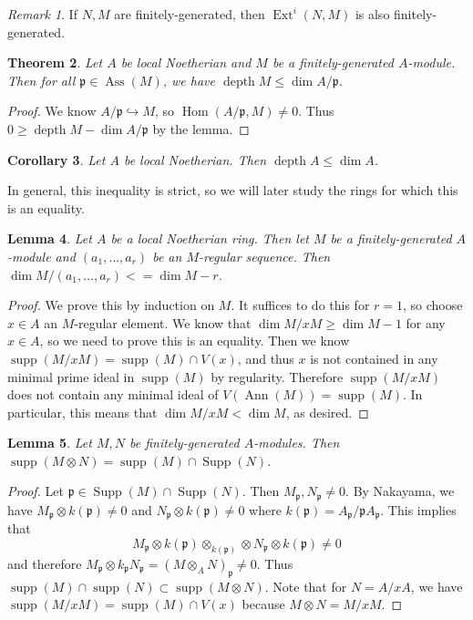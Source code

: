 \documentclass[leqno, openany]{memoir}
\newtheorem{thm}{Theorem}[section]
\newtheorem{cor}[thm]{Corollary}
\newtheorem{lem}[thm]{Lemma}
\theoremstyle{definition}
\theoremstyle{remark}
\newtheorem{rmk}[thm]{Remark}
\theoremstyle{plain}
\theoremstyle{definition}
\theoremstyle{remark}
\newcommand{\mf}[1]{\mathfrak{#1}}
\DeclareMathOperator{\Hom}{Hom}
\DeclareMathOperator{\supp}{supp}
\DeclareMathOperator{\Supp}{Supp}
\DeclareMathOperator{\Ext}{Ext}
\DeclareMathOperator{\Ann}{Ann}
\DeclareMathOperator{\Ass}{Ass}
\DeclareMathOperator{\dpth}{depth}
\begin{document}
\begin{rmk} If $N,M$ are finitely-generated, then $\Ext^i(N,M)$ is also
finitely-generated.  \end{rmk}

\begin{thm} Let $A$ be local Noetherian and $M$ be a finitely-generated
$A$-module. Then for all $\mf{p} \in \Ass(M)$, we have $\operatorname{depth} M
\leq \dim A/\mf{p}$.  \end{thm}

\begin{proof} We know $A/\mf{p} \hookrightarrow M$, so $\Hom(A/\mf{p}, M) \neq
0$. Thus $0 \geq \operatorname{depth} M - \dim A/\mf{p}$ by the lemma.
\end{proof}

\begin{cor} Let $A$ be local Noetherian. Then $\dpth A \leq \dim A$.  \end{cor}

In general, this inequality is strict, so we will later study the rings for
which this is an equality.

\begin{lem} Let $A$ be a local Noetherian ring. Then let $M$ be a
finitely-generated $A$-module and $(a_1, \ldots, a_r)$ be an $M$-regular
sequence. Then $\dim M/(a_1, \ldots, a_r)< = \dim M - r$.  \end{lem}

\begin{proof} We prove this by induction on $M$. It suffices to do this for $r
    = 1$, so choose $x \in A$ an $M$-regular element. We know that $\dim M/xM
    \geq \dim M - 1$ for any $x \in A$, so we need to prove this is an
    equality. Then we know $\supp(M/xM) = \supp(M) \cap V(x)$, and thus $x$ is
    not contained in any minimal prime ideal in $\supp(M)$ by regularity.
    Therefore $\supp(M/xM)$ does not contain any minimal ideal of $V(\Ann(M)) =
    \supp(M)$. In particular, this means that $\dim M/xM < \dim M$, as desired.
\end{proof}

\begin{lem} Let $M,N$ be finitely-generated $A$-modules. Then $\supp(M \otimes
N) = \supp(M) \cap \Supp(N)$.  \end{lem}

\begin{proof} Let $\mf{p} \in \Supp(M) \cap \Supp(N)$. Then $M_{\mf{p}},
    N_{\mf{p}} \neq 0$. By Nakayama, we have $M_{\mf{p}} \otimes k(\mf{p}) \neq
    0$ and $N_{\mf{p}} \otimes k(\mf{p}) \neq 0$ where $k(\mf{p}) = A_{\mf{p}}
    / \mf{p} A_{\mf{p}}$. This implies that \[ M_{\mf{p}} \otimes k(\mf{p})
    \otimes_{k(\mf{p})} \otimes N_{\mf{p}} \otimes k(\mf{p}) \neq 0 \] and
    therefore $M_{\mf{p}} \otimes k_{\mf{p}} N_{\mf{p}} = (M \otimes_A
    N)_{\mf{p}} \neq 0$. Thus $\supp(M) \cap \supp(N) \subset \supp(M \otimes
    N)$. Note that for $N = A/xA$, we have $\supp(M/xM) = \supp(M) \cap V(x)$
    because $M \otimes N = M/xM$.  \end{proof}
\end{document}

